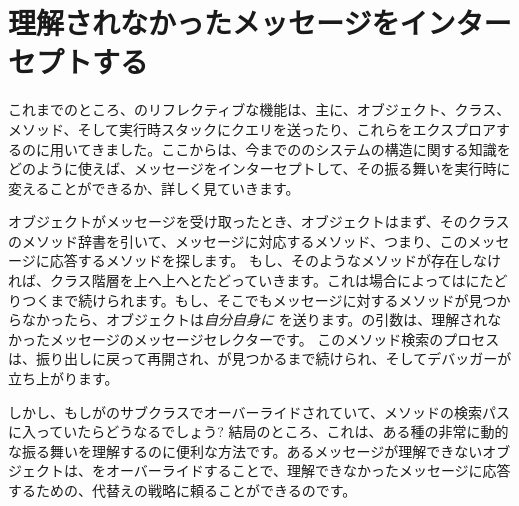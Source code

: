 \documentclass[a4paper,10pt,twoside]{book}
\begin{document}
\section{理解されなかったメッセージをインターセプトする}

これまでのところ、\st{}のリフレクティブな機能は、主に、オブジェクト、クラス、メソッド、そして実行時スタックにクエリを送ったり、これらをエクスプロアするのに用いてきました。ここからは、今までの\st{}のシステムの構造に関する知識をどのように使えば、メッセージをインターセプトして、その振る舞いを実行時に変えることができるか、詳しく見ていきます。

オブジェクトがメッセージを受け取ったとき、オブジェクトはまず、そのクラスのメソッド辞書を引いて、メッセージに対応するメソッド、つまり、このメッセージに応答するメソッドを探します。
もし、そのようなメソッドが存在しなければ、クラス階層を上へ上へとたどっていきます。これは場合によってはにたどりつくまで続けられます。もし、そこでもメッセージに対するメソッドが見つからなかったら、オブジェクトは\emph{自分自身に} を送ります。の引数は、理解されなかったメッセージのメッセージセレクターです。%
このメソッド検索のプロセスは、振り出しに戻って再開され、が見つかるまで続けられ、そしてデバッガーが立ち上がります。

しかし、もしがのサブクラスでオーバーライドされていて、メソッドの検索パスに入っていたらどうなるでしょう?
結局のところ、これは、ある種の非常に動的な振る舞いを理解するのに便利な方法です。あるメッセージが理解できないオブジェクトは、をオーバーライドすることで、理解できなかったメッセージに応答するための、代替えの戦略に頼ることができるのです。
\end{document}
